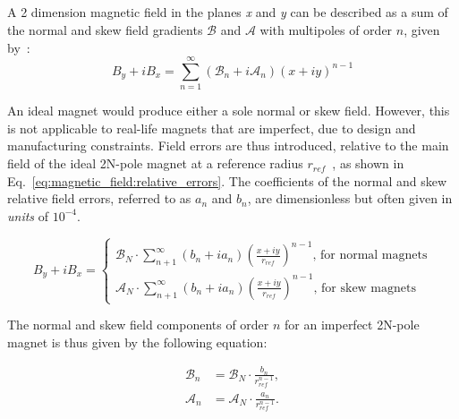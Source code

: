 \subsection{}

A 2 dimension magnetic field in the planes \textit{x} and \textit{y} can be described as a sum of
the normal and skew field gradients $\mathcal{B}$ and $\mathcal{A}$ with multipoles of order $n$,
given by~\cite{wolf_engineering_2001}:
\begin{equation}
    B_y + iB_x = \sum_{n=1}^\infty \left(\mathcal{B}_n + i\mathcal{A}_n \right)  (x+iy)^{n-1}
\end{equation}

An ideal magnet would produce either a sole normal or skew field. However, this is not applicable 
to real-life magnets that are imperfect, due to design and manufacturing constraints.
Field errors are thus introduced, relative to the main field of the ideal 2N-pole magnet at a
reference radius $r_{ref}$~\cite{dilly_corrections_2022}, as shown in 
Eq.~\eqref{eq:magnetic_field:relative_errors}. The coefficients of the normal and skew relative 
field errors, referred to as $a_n$ and $b_n$, are dimensionless but often given in \textit{units}
of $10^{-4}$.

\begin{equation}
    B_y + iB_x = 
        \begin{cases}
            \mathcal{B}_N \cdot \sum_{n+1}^\infty (b_n + ia_n) \left(\frac{x+iy}{r_{ref}}\right)^{n-1}\text{, for normal magnets}\\
            \mathcal{A}_N \cdot \sum_{n+1}^\infty (b_n + ia_n) \left(\frac{x+iy}{r_{ref}}\right)^{n-1}\text{, for skew magnets}
        \end{cases}
    \label{eq:magnetic_field:relative_errors}
\end{equation}


The normal and skew field components of order $n$ for an imperfect 2N-pole magnet is thus given by
the following equation:

\begin{equation}
    \begin{aligned}
        \mathcal{B}_n &= \mathcal{B}_N \cdot \frac{b_n}{r_{ref}^{n-1}}, \\
        \mathcal{A}_n &= \mathcal{A}_N \cdot \frac{a_n}{r_{ref}^{n-1}}.
    \end{aligned}
\end{equation}

